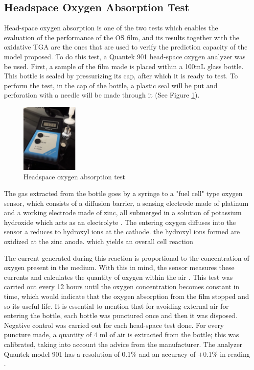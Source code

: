 \begin{refsection}
\subsection{Headspace Oxygen Absorption Test}\label{subsec:headspace}
Head-space oxygen absorption is one of the two tests which enables the evaluation of the performance of the OS film, and its results together with the oxidative TGA are the ones that are used to verify the prediction capacity of the model proposed. To do this test, a Quantek 901 head-space oxygen analyzer was be used. First, a sample of the film made is placed within a 100mL glass bottle. This bottle is sealed by pressurizing its cap, after which it is ready to test. To perform the test, in the cap of the bottle, a plastic seal will be put and perforation with a needle will be made through it (See Figure \ref{fig:headspace}).

\begin{figure}[ht]
    \centering
    \includegraphics[width=0.25\textwidth]{Imagenes/headspace.png}
    \caption{Headspace oxygen absorption test}
    \label{fig:headspace}
\end{figure}

The gas extracted from the bottle goes by a syringe to a "fuel cell" type oxygen sensor, which consists of a diffusion barrier, a sensing electrode made of platinum and a working electrode made of zinc, all submerged in a solution of potassium hydroxide which acts as an electrolyte \cite{Boissevain1996CorporateGuide}. The entering oxygen diffuses into the sensor a reduces to hydroxyl ions at the cathode.
the hydroxyl ions formed are oxidized at the zinc anode.
 which yields an overall cell reaction 

 
 The current generated during this reaction is proportional to the concentration of oxygen present in the medium. With this in mind,  the sensor measures these currents and calculates the quantity of oxygen within the air \cite{GarciaMora2015KineticScavengers, Boissevain1996CorporateGuide}. This test was carried out every 12 hours until the oxygen concentration becomes constant in time, which would indicate that the oxygen absorption from the film stopped and so its useful life. It is essential to mention that for avoiding external air for entering the bottle, each bottle was punctured once and then it was disposed. Negative control was carried out for each head-space test done. For every puncture made, a  quantity of 4 ml of air is extracted from the bottle; this was calibrated, taking into account the advice from the manufacturer. The analyzer Quantek model 901 has a resolution of 0.1\% and an accuracy of $\pm$0.1\% in reading \cite{Instruments2019ModelAnalyzer}. 
 

\end{refsection}
